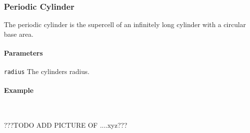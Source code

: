 \subsubsection{Periodic Cylinder}
The periodic cylinder is the supercell of an infinitely long cylinder with a circular base area.

\paragraph{Parameters}
\begin{description}
 \item{\lstinline{radius}} The cylinders radius.
\end{description}

\paragraph{Example}\ 

%
???TODO ADD PICTURE OF ....xyz???